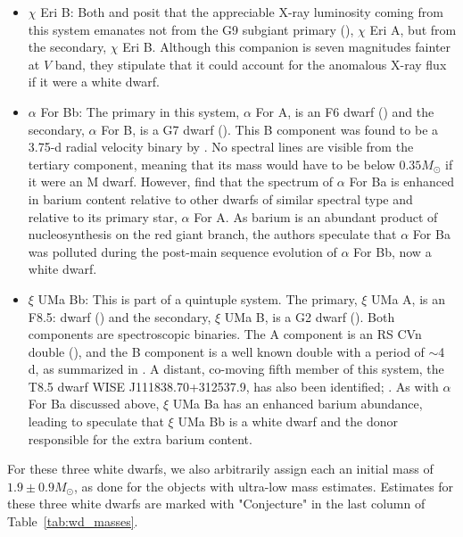 \documentclass[twocolumn,tighten,twocolappendix]{aastex631}
\begin{document}
\begin{itemize}
    \item $\chi$ Eri B: Both \cite{fuhrmann2012} and \cite{fuhrmann2016} posit that the appreciable X-ray luminosity coming from this system emanates not from the G9 subgiant primary (\citealt{gray2006}), $\chi$ Eri A, but from the secondary, $\chi$ Eri B. Although this companion is seven magnitudes fainter at $V$ band, they stipulate that it could account for the anomalous X-ray flux if it were a white dwarf.

    \item $\alpha$ For Bb: The primary in this system, $\alpha$ For A, is an F6 dwarf (\citealt{gray2006}) and the secondary, $\alpha$ For B, is a G7 dwarf (\citealt{corbally1984}). This B component was found to be a 3.75-d radial velocity binary by \cite{fuhrmann2016}. No spectral lines are visible from the tertiary component, meaning that its mass would have to be below $0.35 M_\odot$ if it were an M dwarf. However, \cite{fuhrmann2016} find that the spectrum of $\alpha$ For Ba is enhanced in barium content relative to other dwarfs of similar spectral type and relative to its primary star, $\alpha$ For A. As barium is an abundant product of nucleosynthesis on the red giant branch, the authors speculate that $\alpha$ For Ba was polluted during the post-main sequence evolution of $\alpha$ For Bb, now a white dwarf.

    \item $\xi$ UMa Bb: This is part of a quintuple system. The primary, $\xi$ UMa A, is an F8.5: dwarf (\citealt{keenan1989}) and the secondary, $\xi$ UMa B, is a G2 dwarf (\citealt{keenan1989}). Both components are spectroscopic binaries. The A component is an RS CVn double (\citealt{samus2003}), and the B component is a well known double with a period of $\sim$4 d, as summarized in \cite{fuhrmann2008}. A distant, co-moving fifth member of this system, the T8.5 dwarf WISE J111838.70+312537.9, has also been identified; \citealt{wright2013}. As with $\alpha$ For Ba discussed above, $\xi$ UMa Ba has an enhanced barium abundance, leading \cite{fuhrmann2016} to speculate that $\xi$ UMa Bb is a white dwarf and the donor responsible for the extra barium content. 
\end{itemize}

For these three white dwarfs, we also arbitrarily assign each an initial mass of $1.9{\pm}0.9 M_\odot$, as done for the objects with ultra-low mass estimates. Estimates for these three white dwarfs are marked with "Conjecture" in the last column of Table~\ref{tab:wd_masses}.
\end{document}
